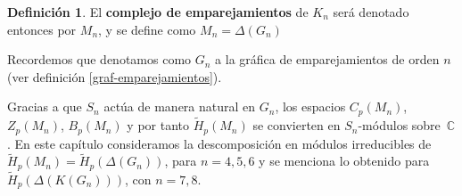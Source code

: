 \documentclass[12pt]{book}
\theoremstyle{definition}
\newtheorem{definition}[theorem]{Definición}
\newcounter{in}
\newcounter{ini}
\begin{document}
\begin{definition}
El \textbf{complejo de emparejamientos} de $K_{n}$ será denotado
entonces por $M_{n}$, y se define como $M_{n}=\Delta(G_{n})$
\end{definition}
Recordemos que denotamos como $G_{n}$ a la gráfica de
emparejamientos de orden $n$ (ver definición \ref{graf-emparejamientos}).


Gracias a que $S_{n}$ actúa de manera
natural en $G_{n}$, los espacios $C_{p}(M_{n})$, $Z_{p}(M_{n})$,
$B_{p}(M_{n})$ y por tanto $\widetilde H_{p}(M_{n})$ se convierten en
$S_{n}$-módulos sobre~$\mathbb{C}$. En este capítulo consideramos
la descomposición en módulos irreducibles de
$\widetilde H_{p}(M_{n})=\widetilde H_{p}(\Delta(G_{n}))$, para
$n=4,5,6$ y se menciona lo obtenido para $\widetilde H_{p}(\Delta(K(G_{n})))$, con $n=7,8$.
\end{document}
